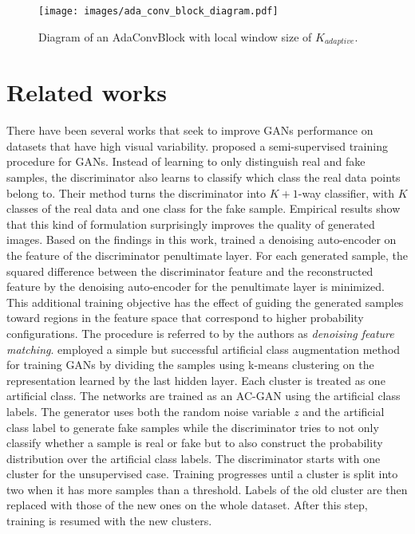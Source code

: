 \documentclass{article} %
\begin{document}
\begin{figure}
\begin{center}
\texttt{[image: images/ada\_conv\_block\_diagram.pdf]}
\end{center}
\caption{Diagram of an AdaConvBlock with local window size of $K_{adaptive}$.}
\label{fig:ada_conv_block}
\end{figure}

\section{Related works}
\label{related_works}
There have been several works that seek to improve GANs performance on datasets that have high visual variability. \cite{salimans2016improved} proposed a semi-supervised training procedure for GANs. Instead of learning to only distinguish real and fake samples, the discriminator also learns to classify which class the real data points belong to. Their method turns the discriminator into $K+1$-way classifier, with $K$ classes of the real data and one class for the fake sample. Empirical results show that this kind of formulation surprisingly improves the quality of generated images. Based on the findings in this work, \cite{warde2016improving} trained a denoising auto-encoder on the feature of the discriminator penultimate layer. For each generated sample, the squared difference between the discriminator feature and the reconstructed feature by the denoising auto-encoder for the penultimate layer is minimized. This additional training objective has the effect of guiding the generated samples toward regions in the feature space that correspond to higher probability configurations. The procedure is referred to by the authors as \textit{denoising feature matching}. \cite{1709.07359} employed a simple but successful artificial class augmentation method for training GANs by dividing the samples using k-means clustering on the representation learned by the last hidden layer. Each cluster is treated as one artificial class. The networks are trained as an AC-GAN \citep{odena2016conditional} using the artificial class labels. The generator uses both the random noise variable $z$ and the artificial class label to generate fake samples while the discriminator tries to not only classify whether a sample is real or fake but to also construct the probability distribution over the artificial class labels. The discriminator starts with one cluster for the unsupervised case. Training progresses until a cluster is split into two when it has more samples than a threshold. Labels of the old cluster are then replaced with those of the new ones on the whole dataset. After this step, training is resumed with the new clusters. \par
\end{document}
